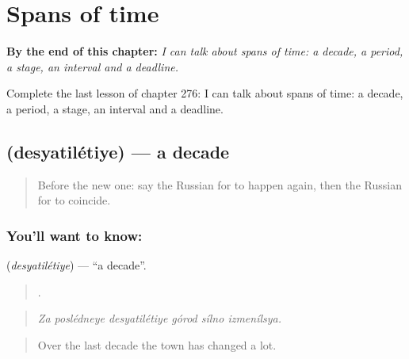 
\chapter{Spans of time}
\label{ch:ru-spans-of-time}

\begin{chapteropening}
\textbf{By the end of this chapter:} \emph{I can talk about spans of time: a decade, a period, a stage, an interval and a deadline.}

Complete the last lesson of chapter 276: I can talk about spans of time: a decade, a period, a stage, an interval and a deadline.
\end{chapteropening}

\section[\texorpdfstring{\ru{десятилетие} (desyatilétiye)}{десятилетие (desyatilétiye)}]{ (desyatilétiye) — a decade}

\label{lesson:RU-C276-desyatiletiye}



\begin{quote}
Before the new one: say the Russian for to happen again, then the Russian for to coincide.
\end{quote}

\subsection*{You'll want to know: }
\textbf{} (\emph{desyatilétiye}) — \textquotedblleft{}a decade\textquotedblright{}.

\begin{quote}
     .
\end{quote}

\begin{quote}
\emph{Za poslédneye desyatilétiye górod sílno izmenílsya.}
\end{quote}

\begin{quote}
Over the last decade the town has changed a lot.
\end{quote}

